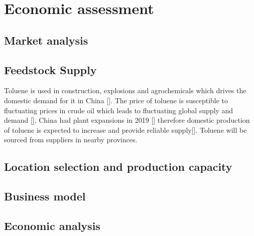 \section{Economic assessment}
\label{sec:economics}
\subsection{Market analysis}



\subsection{Feedstock Supply}
Toluene is used in construction, explosions and agrochemicals which drives the domestic demand for it in China []. The price of toluene is susceptible to fluctuating prices in crude oil which leads to fluctuating global supply and demand []. China had plant expansions in 2019 [] therefore domestic production of toluene is expected to increase and provide reliable supply[]. Toluene will be sourced from suppliers in nearby provinces.

\subsection{Location selection and production capacity} 


\subsection{Business model} 


\subsection{Economic analysis} 